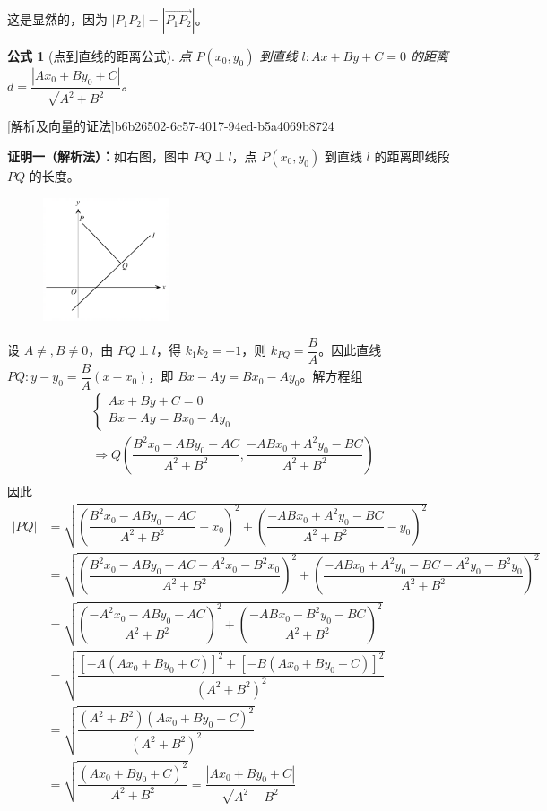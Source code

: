 \documentclass[a4paper,openany]{ctexbook}
\newtheorem{formula}{公式}
\renewcommand{\vec}{\overrightarrow}
\begin{document}
这是显然的，因为 \(|P_1P_2|=|\vec{P_1P_2}|\)。

\begin{formula}[点到直线的距离公式]
    点 \(P(x_0,y_0)\) 到直线 \(l:Ax + By + C = 0\) 的距离 \(d = \dfrac{|Ax_0 + By_0 + C|}{\sqrt{A^2 + B^2}} \)。
\end{formula}

[解析及向量的证法]{b6b26502-6c57-4017-94ed-b5a4069b8724}{
    \textbf{证明一（解析法）：}如右图，图中 \(PQ \perp l\)，点 \(P(x_0,y_0)\) 到直线 \(l\) 的距离即线段 \(PQ\) 的长度。%
    \begin{figure}
        \centering
        \includegraphics[width=10em]{image34.png}
    \end{figure}%
    设 \(A \neq ,B \neq 0\)，由 \(PQ \perp l\)，得 \(k_1k_2 =- 1\)，则 \(k_{PQ} = \dfrac{B}{A}\)。因此直线 \(PQ:y - y_0 = \dfrac{B}{A}(x - x_0)\)，即
    \(Bx - Ay = Bx_0 - Ay_0\)。解方程组
    \begin{gather*}
        \begin{cases} Ax + By + C= 0\\ Bx - Ay = Bx_0 - Ay_0 \end{cases}\\
        \Rightarrow Q\left(\dfrac{B^2x_0 - ABy_0 - AC}{A^2 + B^2},\dfrac{ - ABx_0 + A^2y_0 - BC}{A^2 + B^2}\right)\\
    \end{gather*}
    因此
    \begin{align*}
        |PQ| & = \sqrt{\left( \dfrac{B^2x_0 - ABy_0 - AC}{A^2 + B^2} - x_0 \right)^2 + \left(\dfrac{ - ABx_0 + A^2y_0 - BC}{A^2 + B^2} -y_0\right)^2}                           \\
             & = \sqrt{\left( \dfrac{B^2x_0 - ABy_0 - AC - A^2x_0 - B^2x_0}{A^2 + B^2} \right)^2 + \left(\dfrac{ - ABx_0 + A^2y_0 - BC - A^2y_0 - B^2y_0}{A^2 + B^2} \right)^2} \\
             & = \sqrt{\left( \dfrac{ - A^2x_0 - ABy_0 - AC}{A^2 + B^2} \right)^2 + \left(\dfrac{ - ABx_0 - B^2y_0 - BC}{A^2 + B^2} \right)^2}                                  \\
             & = \sqrt{\dfrac{[ -A(Ax_0 + By_0 + C)]^2 + [ -B(Ax_0 + By_0 + C)]^2}{(A^2 + B^2)^2}}                                                                              \\
             & = \sqrt{\dfrac{(A^2 + B^2)(Ax_0 + By_0 + C)^2}{(A^2 + B^2)^2}}                                                                                                   \\
             & = \sqrt{\dfrac{(Ax_0 + By_0 + C)^2}{A^2 + B^2}} = \dfrac{|Ax_0 + By_0 + C|}{\sqrt{A^2 + B^2}}
    \end{align*}

}
\end{document}
